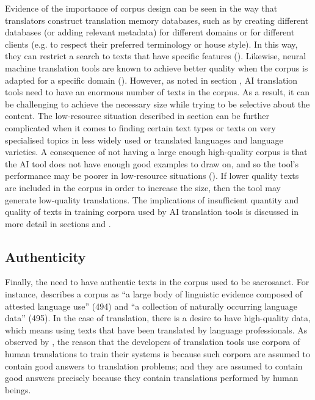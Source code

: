\documentclass[output=paper]{langscibook}
\begin{document}
Evidence of the importance of corpus design can be seen in the way that translators construct translation memory databases, such as by creating different databases (or adding relevant metadata) for different domains or for different clients (e.g. to respect their preferred terminology or house style). In this way, they can restrict a search to texts that have specific features (\citealt{melbywright23}). Likewise, neural machine translation tools are known to achieve better quality when the corpus is adapted for a specific domain (\citealt{chuwang18}). However, as noted in section , AI translation tools need to have an enormous number of texts in the corpus. As a result, it can be challenging to achieve the necessary size while trying to be selective about the content. The low-resource situation described in section  can be further complicated when it comes to finding certain text types or texts on very specialised topics in less widely used or translated languages and language varieties. A consequence of not having a large enough high-quality corpus is that the AI tool does not have enough good examples to draw on, and so the tool’s performance may be poorer in low-resource situations (\citealt{way2025}). If lower quality texts are included in the corpus in order to increase the size, then the tool may generate low-quality translations. The implications of insufficient quantity and quality of texts in training corpora used by AI translation tools is discussed in more detail in sections  and .

\subsection{Authenticity}\label{sec:4:2.1.4}
Finally, the need to have authentic texts in the corpus used to be sacrosanct. For instance, \citet{mcenery22} describes a corpus as “a large body of linguistic evidence composed of attested language use” (494) and “a collection of naturally occurring language data” (495). In the case of translation, there is a desire to have high-quality data, which means using texts that have been translated by language professionals. As observed by \citet[2]{kenny2011}, the reason that the developers of translation tools use corpora of human translations to train their systems is because
such corpora are assumed to contain good answers to translation problems; and they are assumed to contain good answers precisely because they contain translations performed by human beings.
\end{document}
